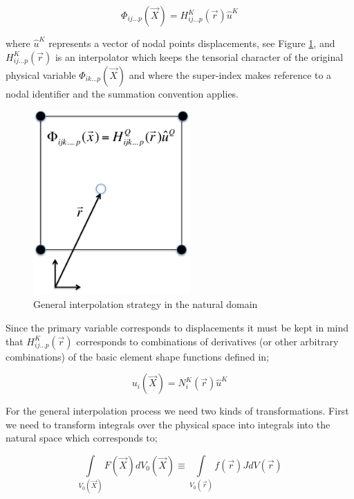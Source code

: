 \begin{equation}
\Phi_{ij...p}(\vec{X})=H_{ij...p}^K(\vec{r})\hat{u}^K
\label{interpol}
\end{equation}	 						

where $\hat{u}^K$ represents a vector of nodal points displacements, see Figure \ref{fig:interpol nat dom}, and $H_{ij...p}^K(\vec{r})$ is an interpolator which keeps the tensorial character of the original physical variable $\Phi_{ik...p}(\vec{X})$   and where the super-index makes reference to a nodal identifier and the summation convention applies.


\begin{figure}[h]
\centering
\includegraphics[width=6cm]{img/figure2.pdf}
\caption{General interpolation strategy in the natural domain}
\label{fig:interpol nat dom}
\end{figure}
 


Since the primary variable corresponds to displacements it must be kept in mind that $H_{ij...p}^K(\vec{r})$ corresponds to combinations of derivatives (or other arbitrary combinations) of the basic element shape functions defined in;


\begin{equation}
u_i(\vec{X})=N_i^K(\vec{r})\hat{u}^K
\label{el interpol}
\end{equation}



For the general interpolation process we need two kinds of transformations.  First we need to transform integrals over the physical space into integrals into the natural space which corresponds to;


\begin{equation}
\int\limits_{V_0(\vec{X})} F(\vec{X})dV_0(\vec{X})\equiv \int\limits_{V_0(\vec{r})} f(\vec{r})J dV(\vec{r})
\label{gen trans}
\end{equation}



